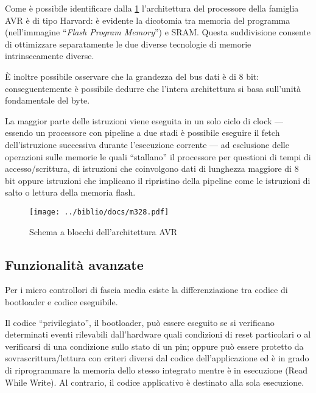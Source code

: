 Come è possibile identificare dalla \cref{fig:avr-arch} l'architettura del processore della famiglia AVR è di tipo Harvard: è evidente la dicotomia tra memoria del programma (nell'immagine ``\textit{Flash Program Memory}'') e SRAM\cite{harvard-arch}. Questa suddivisione consente di ottimizzare separatamente le due diverse tecnologie di memorie intrinsecamente diverse.

È inoltre possibile osservare che la grandezza del bus dati è di 8 bit: conseguentemente è possibile dedurre che l'intera architettura si basa sull'unità fondamentale del byte.

La maggior parte delle istruzioni viene eseguita in un solo ciclo di clock\cite[sec 7.6]{avr:m328p} --- essendo un processore con pipeline a due stadi è possibile eseguire il fetch dell'istruzione successiva durante l'esecuzione corrente --- ad esclusione delle operazioni sulle memorie le quali ``stallano'' il processore per questioni di tempi di accesso/scrittura, di istruzioni che coinvolgono dati di lunghezza maggiore di 8 bit oppure istruzioni che implicano il ripristino della pipeline come le istruzioni di salto o lettura della memoria flash.

\begin{figure}[t]
    \centering
    \texttt{[image: ../biblio/docs/m328.pdf]}
    \caption[Immagine ottenuta dal documento~\cite{avr:m328p} fig 7-1]{Schema a blocchi dell'architettura AVR\cite[fig 7-1]{avr:m328p}}\label{fig:avr-arch}
\end{figure}

\subsection{Funzionalità avanzate}\label{ss:advanced-features}

Per i micro controllori di fascia media esiste la differenziazione tra codice di bootloader e codice eseguibile.

Il codice ``privilegiato'', il bootloader, può essere eseguito se si verificano determinati eventi rilevabili dall'hardware quali condizioni di reset particolari o al verificarsi di una condizione sullo stato di un pin; oppure può essere protetto da sovrascrittura/lettura con criteri diversi dal codice dell'applicazione ed è in grado di riprogrammare la memoria dello stesso integrato mentre è in esecuzione (Read While Write)\cite[sec 27.4]{avr:m328p}. Al contrario, il codice applicativo è destinato alla sola esecuzione.

